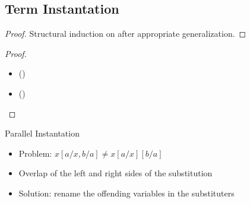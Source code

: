 \subsection{Term Instantation}

\begin{frame}
    \begin{lemma}
    \end{lemma}
    \begin{proof}
        Structural induction on  after appropriate generalization.
    \end{proof}

    \begin{theorem}
    \end{theorem}
    \begin{proof}
        \begin{itemize}
            \item {} (\aIv)
            \item {} (\aE)
        \end{itemize}
    \end{proof}
\end{frame}

\begin{frame}{Parallel Instantation}
    \begin{itemize}
        \item Problem: \(x [a/x, b/a] \neq x [a/x][b/a]\)
        \item Overlap of the left and right sides of the substitution
        \item Solution: rename the offending variables in the substituters
    \end{itemize}
\end{frame}

